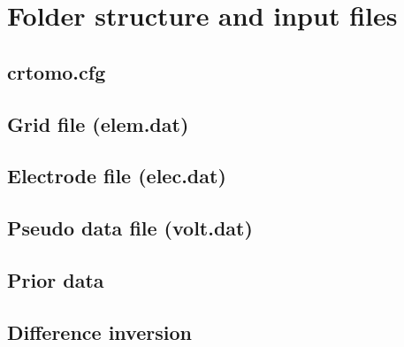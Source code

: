 \section{Folder structure and input files}\label{sect:crtomo_dir}
\subsection{crtomo.cfg}\label{sub:crtomo_input}
\subsection{Grid file (elem.dat)}\label{sub:crtomo_grid}
\subsection{Electrode file (elec.dat)}\label{sub:crtomo_elec}
\subsection{Pseudo data file (volt.dat)}\label{sub:crtomo_volt}
\subsection{Prior data}\label{sub:crtomo_prior}
\subsection{Difference inversion}\label{sub:crtomo_diffinv}
